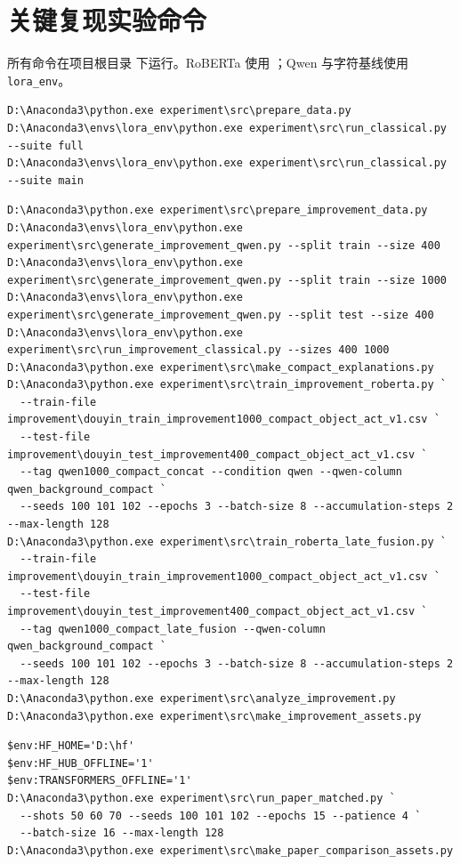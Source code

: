 \documentclass[UTF8,zihao=-4,a4paper]{ctexart}
\begin{document}
\section{关键复现实验命令}

所有命令在项目根目录  下运行。RoBERTa 使用 ；Qwen 与字符基线使用 \texttt{lora\_env}。

\begin{lstlisting}[language={},caption={数据准备与基线}]
D:\Anaconda3\python.exe experiment\src\prepare_data.py
D:\Anaconda3\envs\lora_env\python.exe experiment\src\run_classical.py --suite full
D:\Anaconda3\envs\lora_env\python.exe experiment\src\run_classical.py --suite main
\end{lstlisting}

\begin{lstlisting}[language={},caption={改进实验：固定数据、结构化释义与 OOF 融合}]
D:\Anaconda3\python.exe experiment\src\prepare_improvement_data.py
D:\Anaconda3\envs\lora_env\python.exe experiment\src\generate_improvement_qwen.py --split train --size 400
D:\Anaconda3\envs\lora_env\python.exe experiment\src\generate_improvement_qwen.py --split train --size 1000
D:\Anaconda3\envs\lora_env\python.exe experiment\src\generate_improvement_qwen.py --split test --size 400
D:\Anaconda3\envs\lora_env\python.exe experiment\src\run_improvement_classical.py --sizes 400 1000
D:\Anaconda3\python.exe experiment\src\make_compact_explanations.py
D:\Anaconda3\python.exe experiment\src\train_improvement_roberta.py `
  --train-file improvement\douyin_train_improvement1000_compact_object_act_v1.csv `
  --test-file improvement\douyin_test_improvement400_compact_object_act_v1.csv `
  --tag qwen1000_compact_concat --condition qwen --qwen-column qwen_background_compact `
  --seeds 100 101 102 --epochs 3 --batch-size 8 --accumulation-steps 2 --max-length 128
D:\Anaconda3\python.exe experiment\src\train_roberta_late_fusion.py `
  --train-file improvement\douyin_train_improvement1000_compact_object_act_v1.csv `
  --test-file improvement\douyin_test_improvement400_compact_object_act_v1.csv `
  --tag qwen1000_compact_late_fusion --qwen-column qwen_background_compact `
  --seeds 100 101 102 --epochs 3 --batch-size 8 --accumulation-steps 2 --max-length 128
D:\Anaconda3\python.exe experiment\src\analyze_improvement.py
D:\Anaconda3\python.exe experiment\src\make_improvement_assets.py
\end{lstlisting}

\begin{lstlisting}[language={},caption={与原论文 Table 5 的 full-test shot 匹配实验}]
$env:HF_HOME='D:\hf'
$env:HF_HUB_OFFLINE='1'
$env:TRANSFORMERS_OFFLINE='1'
D:\Anaconda3\python.exe experiment\src\run_paper_matched.py `
  --shots 50 60 70 --seeds 100 101 102 --epochs 15 --patience 4 `
  --batch-size 16 --max-length 128
D:\Anaconda3\python.exe experiment\src\make_paper_comparison_assets.py
\end{lstlisting}
\end{document}
